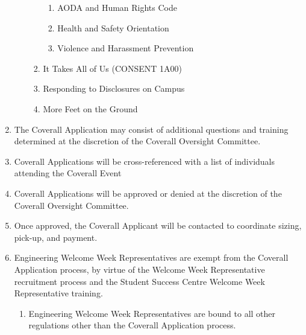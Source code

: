 \begin{enumerate}
\begin{enumerate}
\begin{enumerate}
      \begin{enumerate}
       \item
        AODA and Human Rights Code
       \item
        Health and Safety Orientation
       \item
        Violence and Harassment Prevention
      \end{enumerate}
     \item
      It Takes All of Us (CONSENT 1A00)
     \item
      Responding to Disclosures on Campus
     \item
      More Feet on the Ground
    \end{enumerate}
  \end{enumerate}
 \item
  The Coverall Application may consist of additional questions and
  training determined at the discretion of the Coverall Oversight
  Committee.
 \item
  Coverall Applications will be cross-referenced with a list of
  individuals attending the Coverall Event
 \item
  Coverall Applications will be approved or denied at the discretion of
  the Coverall Oversight Committee.
 \item
  Once approved, the Coverall Applicant will be contacted to coordinate
  sizing, pick-up, and payment.
 \item
  Engineering Welcome Week Representatives are exempt from the Coverall
  Application process, by virtue of the Welcome Week Representative
  recruitment process and the Student Success Centre Welcome Week
  Representative training.
  \begin{enumerate}
   \item
    Engineering Welcome Week Representatives are bound to all other
    regulations other than the Coverall Application process.
  \end{enumerate}
\end{enumerate}
